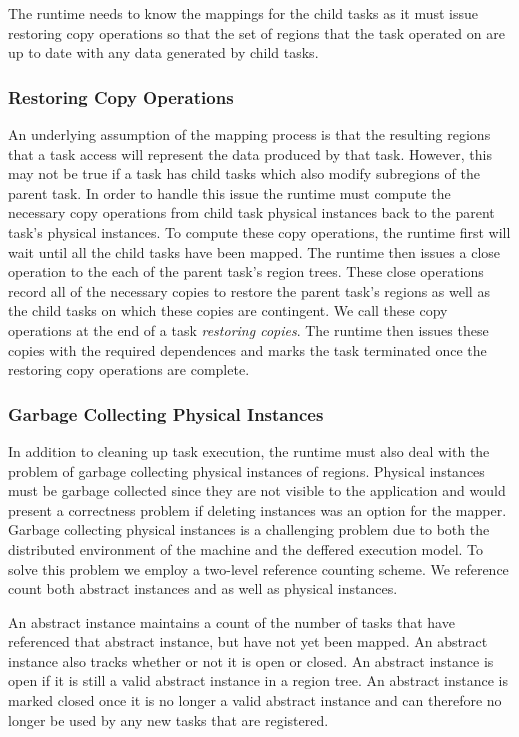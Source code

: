 The runtime needs to know the mappings for
the child tasks as it must issue restoring copy operations so that the set of regions
that the task operated on are up to date with any data generated by child tasks.  

\subsubsection{Restoring Copy Operations}
\label{subsec:restore}
An underlying assumption of the mapping process is that the resulting regions that
a task access will represent the data produced by that task.  However, this may not
be true if a task has child tasks which also modify subregions of the parent task.
In order to handle this issue the runtime must compute the necessary copy operations
from child task physical instances back to the parent task's physical instances.  To
compute these copy operations, the runtime first will wait until all the child tasks
have been mapped.  The runtime then issues a close operation to the each of the parent
task's region trees.  These close operations record all of the necessary copies to
restore the parent task's regions as well as the child tasks on which these copies
are contingent.  We call these copy operations at the end of a task {\em restoring copies}.
The runtime then issues these copies with the required dependences
and marks the task terminated once the restoring copy operations are complete.

\subsubsection{Garbage Collecting Physical Instances}
\label{subsec:garbage}
In addition to cleaning up task execution, the runtime must also deal with the problem
of garbage collecting physical instances of regions.  Physical instances must be
garbage collected since they are not visible to the application and would present
a correctness problem if deleting instances was an option for the mapper.  
Garbage collecting physical instances is a challenging problem
due to both the distributed environment of the machine and the deffered execution
model.  To solve this problem we employ a two-level reference counting scheme.  We
reference count both abstract instances and as well as physical instances.  

An abstract instance maintains a count of the number of tasks that have referenced 
that abstract instance, but have not yet been mapped.  An abstract instance also tracks
whether or not it is open or closed.  An abstract instance is open if it is still
a valid abstract instance in a region tree.  An abstract instance is marked closed
once it is no longer a valid abstract instance and can therefore no longer be used
by any new tasks that are registered.

